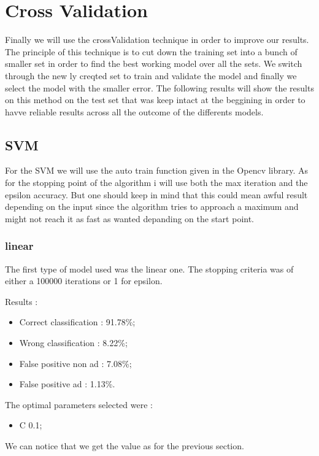 \section{Cross Validation}

Finally we will use the crossValidation technique in order to improve our results. The principle of this technique is to cut down the training set into a bunch of smaller set in order to find the best working model over all the sets. We switch through the new ly creqted set to train and validate the model and finally we select the model with the smaller error. The following results will show the results on this method on the test set that was keep intact at the beggining in order to havve reliable results across all the outcome of the differents models.

\subsection{SVM}

For the SVM we will use the auto train function given in the Opencv library. As for the stopping point of the algorithm i will use both the max iteration and the epsilon accuracy. But one should keep in mind that this could mean awful result depending on the input since the algorithm tries to approach a maximum and might not reach it as fast as wanted depanding on the start point.

\subsubsection{linear}

The first type of model used was the linear one. The stopping criteria was of either a 100000 iterations or 1 for epsilon.

Results :
\begin{itemize}
  \item Correct classification : 91.78\%;
  \item Wrong classification : 8.22\%;
  \item False positive non ad : 7.08\%;
  \item False positive ad : 1.13\%.
\end{itemize}

The optimal parameters selected were :
\begin{itemize}
  \item C 0.1;
\end{itemize}

We can notice that we get the value as for the previous section.


